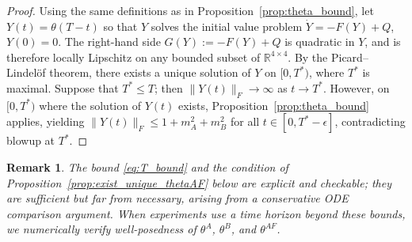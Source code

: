 \documentclass[letterpaper, 10 pt, conference]{ieeeconf}
\newcommand{\R}{\mathbb R}
\newtheorem{remark}{Remark}
\newcommand{\rh}[1]{\textcolor{purple}{\textsf{[RH: #1]}}}
\begin{document}
\begin{proof}
    Using the same definitions as in Proposition~\ref{prop:theta_bound}, let $Y(t) = \theta(T-t)$ so that $Y$ solves the initial value problem $\dot{Y} = -F(Y) + Q$, $Y(0) = 0$.  
    The right-hand side $G(Y) := -F(Y) + Q$ is quadratic in $Y$, and is therefore locally Lipschitz on any bounded subset of $\R^{4\times 4}$.
    By the Picard--Lindel\"of theorem, there exists a unique solution of $Y$ on $[0,T^\ast)$, where $T^\ast$ is maximal.
    Suppose that $T^* \leq T$; then $\|Y(t)\|_F \to \infty$ as $t \to T^*$. 
    However, on $[0, T^\ast)$ where the solution of $Y(t)$ exists, Proposition~\ref{prop:theta_bound} applies, yielding $\|Y(t)\|_F \leq 1 + m_A^2 + m_B^2$ for all $t \in [0,T^\ast - \epsilon]$, contradicting blowup at $T^*$. %
\end{proof}

\begin{remark}
    The bound \eqref{eq:T_bound} and the condition of Proposition~\ref{prop:exist_unique_thetaAF} below are explicit and checkable; they are sufficient but far from necessary, arising from a conservative ODE comparison argument.  When experiments use a time horizon beyond these bounds, we numerically verify well-posedness of $\theta^A$, $\theta^B$, and $\theta^{AF}$.
\end{remark}

\end{document}

